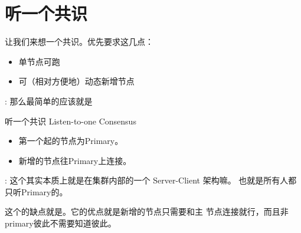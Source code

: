 \section{听一个共识}
让我们来想一个共识。优先要求这几点：
\begin{itemize}
\item 单节点可跑
\item 可（相对方便地）动态新增节点
\end{itemize}
 : 那么最简单的应该就是
\begin{myBox}{听一个共识 Listen-to-one Consensus}
  \label{cons-a}
  \begin{itemize}
  \item 第一个起的节点为Primary。
  \item 新增的节点往Primary上连接。
  \end{itemize}
\end{myBox}

 : 这个其实本质上就是在集群内部的一个 Server-Client 架构嘛。
也就是所有人都只听Primary的。
\begin{center}
\end{center}
这个的缺点就是。它的优点就是新增的节点只需要和主
节点连接就行，而且非primary彼此不需要知道彼此。

